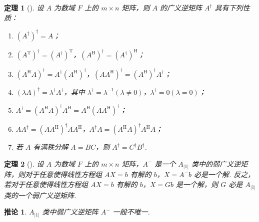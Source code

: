 \documentclass[zihao=-4,UTF8,linespread=1.8,nothm]{aytony_base}
\newtheorem{theorem}{\indent 定理}[subsection]
\newtheorem*{corollary}{\indent 推论}
\begin{document}
\begin{theorem}[]
    设 $A$ 为数域 $F$ 上的 $m \times n$ 矩阵，则 $A$ 的广义逆矩阵 $A^\dagger$ 具有下列性质：
    \begin{enumerate}[nosep]
        \item $(A^\dagger)^\dagger = A$；
        \item $(A ^{\mathrm{T}})^\dagger = (A^\dagger) ^{\mathrm{T}}$，$(A^{\mathrm{H}})^\dagger = (A^\dagger)^\mathrm{H}$；
        \item $(A^\mathrm{H}A)^{\dagger} = A^\dagger (A^{\mathrm{H}})^\dagger$，$(AA^\mathrm{H})^\dagger = (A^\mathrm{H})^\dagger A^\dagger$；
        \item $(\lambda A)^\dagger = \lambda^\dagger A^\dagger$，其中 $\lambda^\dagger = \lambda^{-1}(\lambda \neq 0)$，$\lambda^\dagger = 0(\lambda = 0)$；
        \item $A^\dagger = (A^\mathrm{H}A)^\dagger A^\mathrm{H} = A^\mathrm{H}(AA^\mathrm{H})^\dagger$；
        \item $AA^\dagger = (AA^\mathrm{H})^\dagger AA^\mathrm{H}$，$A^\dagger A = (A^\mathrm{H}A)^\dagger A^\mathrm{H}A$；
        \item 若 $A$ 有满秩分解 $A = BC$，则 $A^\dagger = C^\dagger B^\dagger$.
    \end{enumerate}
\end{theorem}

\begin{theorem}[]
    设 $A$ 为数域 $F$ 上的 $m \times n$ 矩阵，$A^-$ 是一个 $A_{|1|}$ 类中的弱广义逆矩阵，则对于任意使得线性方程组 $AX = b$ 有解的 $b$，$X = A^-b$ 必是一个解. 反之，若对于任意使得线性方程组 $AX = b$ 有解的 $b$，$X = Gb$ 是一个解，则 $G$ 必是 $A_{|1|}$ 类的一个弱广义逆矩阵.
\end{theorem}

\begin{corollary}
    $A_{|1|}$ 类中弱广义逆矩阵 $A^-$ 一般不唯一.
\end{corollary}
\end{document}
